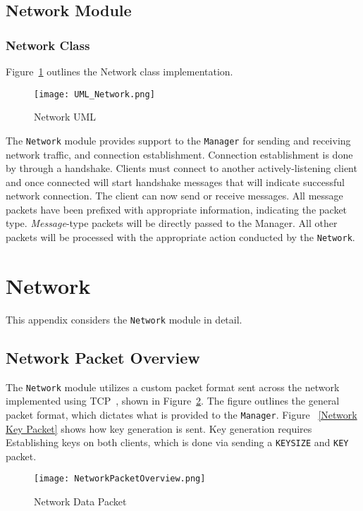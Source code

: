 \documentclass[sigconf]{acmart}
\begin{document}
\subsection{Network Module}
\subsubsection{Network Class}
Figure~\ref{Network UML} outlines the Network class implementation.
\begin{figure}[htb]
	\begin{center}
		\texttt{[image: UML\_Network.png]}
		\caption{Network UML}
		\label{Network UML}
	\end{center}
\end{figure}
The \texttt{Network} module provides support to the \texttt{Manager} for sending and receiving
network traffic, and connection establishment. Connection establishment is done by through a
handshake. Clients must connect to another actively-listening client and once connected will start
handshake messages that will indicate successful network connection. The client can now send or
receive messages. All message packets have been prefixed with appropriate information, indicating
the packet type. \textit{Message}-type packets will be directly passed to the Manager. All other
packets will be processed with the appropriate action conducted by the \texttt{Network}.



\appendix
\section{Network} %
This appendix considers the \texttt{Network} module in detail.

\subsection{Network Packet Overview}
The \texttt{Network} module utilizes a custom packet format sent across the network implemented
using TCP~\cite{Postel:rfc793}, shown in Figure~\ref{Network Packet Overview}. The figure outlines
the general packet format, which dictates what is provided to the \texttt{Manager}. Figure
~\ref{Network Key Packet} shows how key generation is sent. Key generation requires Establishing
keys on both clients, which is done via sending a \texttt{KEYSIZE} and \texttt{KEY} packet.
\begin{figure} [htb]
	\centering
	\texttt{[image: NetworkPacketOverview.png]}
	\caption{Network Data Packet}
	\label{Network Packet Overview}
\end{figure}
\end{document}
